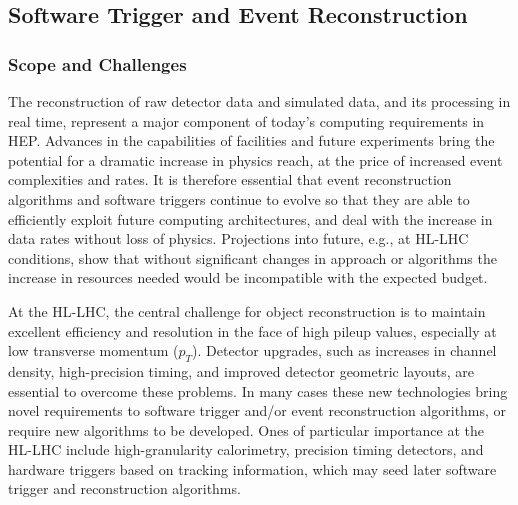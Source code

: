 \hypertarget{software-trigger-and-event-reconstruction}{%
\subsection{Software Trigger and Event
Reconstruction}\label{software-trigger-and-event-reconstruction}}

\subsubsection*{Scope and Challenges}

The reconstruction of raw detector data and simulated data, and its
processing in real time, represent a major component of today's
computing requirements in HEP. Advances in the capabilities of
facilities and future
experiments bring the potential for a dramatic increase in physics
reach, at the price of increased event complexities and rates. It is
therefore essential that event reconstruction algorithms and software
triggers continue to evolve so that they are able to efficiently exploit
future computing architectures, and deal with the increase in data rates
without loss of physics. Projections into future, e.g., at HL-LHC conditions,
show that without significant changes in approach or algorithms
the increase in resources needed would be incompatible with
the expected budget.

At the HL-LHC, the central challenge for object reconstruction is to
maintain excellent efficiency and resolution in the face of high pileup
values, especially at low transverse momentum ($p_T$).
Detector upgrades, such as increases in channel density, high-precision
timing, and improved detector geometric layouts, are essential to
overcome these problems. In many cases these new technologies bring
novel requirements to software trigger and/or event reconstruction
algorithms, or require new algorithms to be developed. Ones of
particular importance at the HL-LHC include high-granularity
calorimetry, precision timing detectors, and hardware triggers based on
tracking information, which may seed later software trigger and
reconstruction algorithms.

